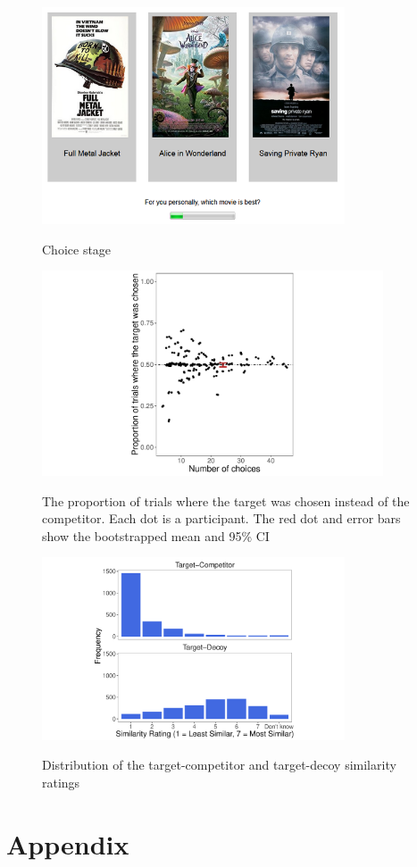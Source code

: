 \documentclass[12pt, a4paper]{article}
\begin{document}
\begin{figure}[htb!]
\centering
\captionsetup{justification=centering}
\caption{Choice stage}
\includegraphics[width=0.8\textwidth]{rsz_exp1_choicestage.png}
\label{fig:exp1_screenshot}
\end{figure}
\clearpage

\begin{figure}[htb!]
\centering
\captionsetup{justification=centering}
\caption{The proportion of trials where the target was chosen instead of the competitor. Each dot is a participant. The red dot and error bars show the bootstrapped mean and 95\% CI}
\includegraphics[width=0.9\textwidth]{figure4.pdf}
\label{fig:exp2_res}
\end{figure}
\clearpage


\begin{figure}[htb!]
\centering
\captionsetup{justification=centering}
		\caption{Distribution of the target-competitor and target-decoy similarity ratings}
\includegraphics[width=0.8\textwidth]{figure5.pdf}
\label{fig:exp2_similarityratings}
\end{figure}

\clearpage

\section*{Appendix}
\end{document}

